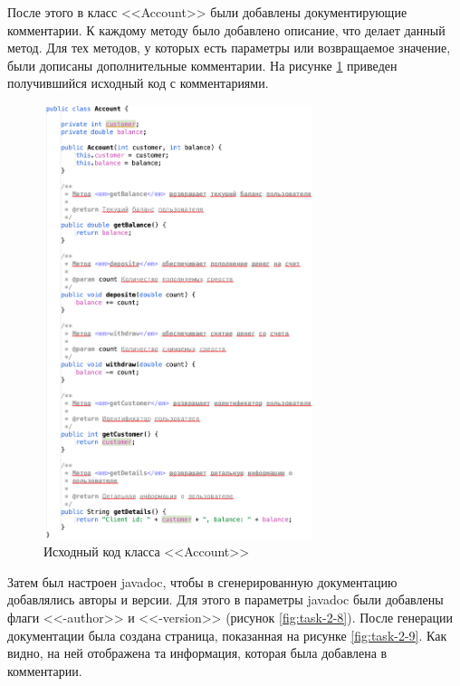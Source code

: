 \documentclass[a4paper, 14pt]{extarticle}
\begin{document}
После этого в класс <<\foreignlanguage{english}{Account}>> были добавлены
документирующие комментарии. К каждому методу было добавлено описание, что
делает данный метод. Для тех методов, у которых есть параметры или возвращаемое
значение, были дописаны дополнительные комментарии. На рисунке
\ref{fig:task-2-7} приведен получившийся исходный код с комментариями.

\begin{figure}[H]
  \centering
  \includegraphics[width=0.7\textwidth]{images/task-2/7.png}
  \caption{Исходный код класса <<\foreignlanguage{english}{Account}>>}
  \label{fig:task-2-7}
\end{figure}

Затем был настроен javadoc, чтобы в сгенерированную документацию добавлялись
авторы и версии. Для этого в параметры javadoc были добавлены флаги <<-author>>
и <<-version>> (рисунок \ref{fig:task-2-8}). После генерации документации была
создана страница, показанная на рисунке \ref{fig:task-2-9}. Как видно, на ней
отображена та информация, которая была добавлена в комментарии.
\end{document}

